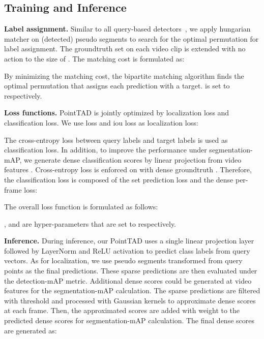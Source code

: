 \documentclass{article}
\renewcommand{\paragraph}[1]{\vspace{1.25mm}\noindent\textbf{#1}}
\begin{document}
\subsection{Training and Inference}
\paragraph{Label assignment.} Similar to all query-based detectors~\cite{DBLP:conf/eccv/CarionMSUKZ20,DBLP:conf/iclr/ZhuSLLWD21,DBLP:journals/corr/abs-2203-16507,DBLP:conf/iccv/TanT0W21}, we apply hungarian matcher on (detected) pseudo segments to search for the optimal permutation  for label assignment. The groundtruth set  on each video clip is extended with no action  to the size of . The matching cost is formulated as:

By minimizing the matching cost, the bipartite matching algorithm finds the optimal permutation  that assigns each prediction with a target.  is set to  respectively.

\paragraph{Loss functions.} PointTAD is jointly optimized by localization loss and classification loss. We use  loss and iou loss as localization loss:

The cross-entropy loss between query labels and target labels is used as classification loss. In addition, to improve the performance under segmentation-mAP, we generate dense classification scores  by linear projection from video features . Cross-entropy loss is enforced on  with dense groundtruth . Therefore, the classification loss is composed of the set prediction loss and the dense per-frame loss:

The overall loss function is formulated as follows:

,  and  are hyper-parameters that are set to  respectively.

\paragraph{Inference.}
During inference, our PointTAD uses a single linear projection layer followed by LayerNorm and ReLU activation to predict class labels from query vectors. As for localization, we use pseudo segments transformed from query points as the final predictions. These sparse predictions are then evaluated under the detection-mAP metric. Additional dense scores  could be generated at video features for the segmentation-mAP calculation. 
The sparse predictions are filtered with threshold  and processed with Gaussian kernels to approximate dense scores at each frame. Then, the approximated scores are added with weight  to the predicted dense scores for segmentation-mAP calculation. The final dense scores are generated as:
\end{document}
